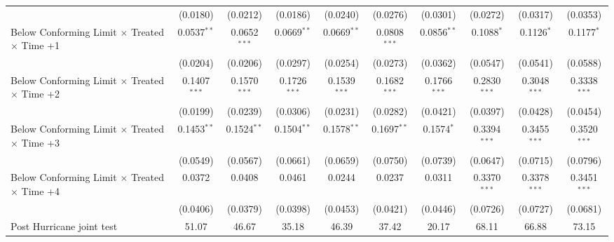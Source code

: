 \begin{tabular}{lccccccccc}
                                                              & (0.0180)       & (0.0212)       & (0.0186)             & (0.0240)       & (0.0276)       & (0.0301)       & (0.0272)       & (0.0317)       & (0.0353)\\   
   Below Conforming Limit $\times$ Treated $\times$ Time +1   & 0.0537$^{**}$  & 0.0652$^{***}$ & 0.0669$^{**}$        & 0.0669$^{**}$  & 0.0808$^{***}$ & 0.0856$^{**}$  & 0.1088$^{*}$   & 0.1126$^{*}$   & 0.1177$^{*}$\\   
                                                              & (0.0204)       & (0.0206)       & (0.0297)             & (0.0254)       & (0.0273)       & (0.0362)       & (0.0547)       & (0.0541)       & (0.0588)\\   
   Below Conforming Limit $\times$ Treated $\times$ Time +2   & 0.1407$^{***}$ & 0.1570$^{***}$ & 0.1726$^{***}$       & 0.1539$^{***}$ & 0.1682$^{***}$ & 0.1766$^{***}$ & 0.2830$^{***}$ & 0.3048$^{***}$ & 0.3338$^{***}$\\   
                                                              & (0.0199)       & (0.0239)       & (0.0306)             & (0.0231)       & (0.0282)       & (0.0421)       & (0.0397)       & (0.0428)       & (0.0454)\\   
   Below Conforming Limit $\times$ Treated $\times$ Time +3   & 0.1453$^{**}$  & 0.1524$^{**}$  & 0.1504$^{**}$        & 0.1578$^{**}$  & 0.1697$^{**}$  & 0.1574$^{*}$   & 0.3394$^{***}$ & 0.3455$^{***}$ & 0.3520$^{***}$\\   
                                                              & (0.0549)       & (0.0567)       & (0.0661)             & (0.0659)       & (0.0750)       & (0.0739)       & (0.0647)       & (0.0715)       & (0.0796)\\   
   Below Conforming Limit $\times$ Treated $\times$ Time +4   & 0.0372         & 0.0408         & 0.0461               & 0.0244         & 0.0237         & 0.0311         & 0.3370$^{***}$ & 0.3378$^{***}$ & 0.3451$^{***}$\\   
                                                              & (0.0406)       & (0.0379)       & (0.0398)             & (0.0453)       & (0.0421)       & (0.0446)       & (0.0726)       & (0.0727)       & (0.0681)\\   
   Post Hurricane joint test                                  & 51.07          & 46.67          & 35.18                & 46.39          & 37.42          & 20.17          & 68.11          & 66.88          & 73.15\\  

\end{tabular}
